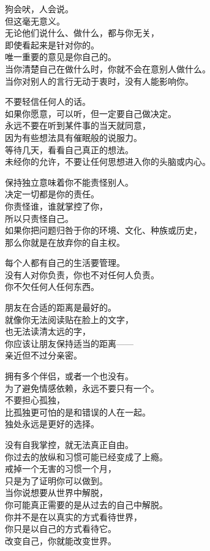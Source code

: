\documentclass[
]{article}
\begin{document}
狗会吠，人会说。\\
但这毫无意义。\\
无论他们说什么、做什么，都与你无关，\\
即使看起来是针对你的。\\
唯一重要的意见是你自己的。\\
当你清楚自己在做什么时，你就不会在意别人做什么。\\
当你对别人的言行无动于衷时，没有人能影响你。

不要轻信任何人的话。\\
如果你愿意，可以听，但一定要自己做决定。\\
永远不要在听到某件事的当天就同意，\\
因为有些想法具有催眠般的说服力。\\
等待几天，看看自己真正的想法。\\
未经你的允许，不要让任何思想进入你的头脑或内心。

保持独立意味着你不能责怪别人。\\
决定一切都是你的责任。\\
你责怪谁，谁就掌控了你，\\
所以只责怪自己。\\
如果你把问题归咎于你的环境、文化、种族或历史，\\
那么你就是在放弃你的自主权。

每个人都有自己的生活要管理。\\
没有人对你负责，你也不对任何人负责。\\
你不欠任何人任何东西。

朋友在合适的距离是最好的。\\
就像你无法阅读贴在脸上的文字，\\
也无法读清太远的字，\\
你应该让朋友保持适当的距离------\\
亲近但不过分亲密。

拥有多个伴侣，或者一个也没有。\\
为了避免情感依赖，永远不要只有一个。\\
不要担心孤独，\\
比孤独更可怕的是和错误的人在一起。\\
独处永远是更好的选择。

没有自我掌控，就无法真正自由。\\
你过去的放纵和习惯可能已经变成了上瘾。\\
戒掉一个无害的习惯一个月，\\
只是为了证明你可以做到。\\
当你说想要从世界中解脱，\\
你可能真正需要的是从过去的自己中解脱。\\
你并不是在以真实的方式看待世界，\\
你只是以自己的方式看待它。\\
改变自己，你就能改变世界。
\end{document}

